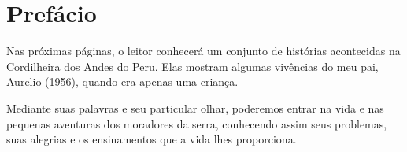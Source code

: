 \cleardoublepage
\newpage
\thispagestyle{empty}
\vfill


\chapter*{Prefácio} %

Nas próximas páginas, o leitor conhecerá um conjunto de histórias acontecidas na Cordilheira dos Andes do Peru. Elas mostram algumas vivências do meu pai, Aurelio (1956), quando era apenas uma criança.

Mediante suas palavras e seu particular olhar, poderemos entrar na vida e nas pequenas aventuras dos moradores da serra, conhecendo assim seus problemas, suas alegrias e os ensinamentos que a vida lhes proporciona. 
\vfill

\newpage
\thispagestyle{empty}

